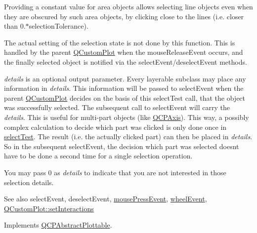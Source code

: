 Providing a constant value for area objects allows selecting line objects even when they are obscured by such area objects, by clicking close to the lines (i.\+e. closer than 0.$\ast$selection\+Tolerance).

The actual setting of the selection state is not done by this function. This is handled by the parent \hyperlink{class_q_custom_plot}{Q\+Custom\+Plot} when the mouse\+Release\+Event occurs, and the finally selected object is notified via the select\+Event/deselect\+Event methods.

{\itshape details} is an optional output parameter. Every layerable subclass may place any information in {\itshape details}. This information will be passed to select\+Event when the parent \hyperlink{class_q_custom_plot}{Q\+Custom\+Plot} decides on the basis of this select\+Test call, that the object was successfully selected. The subsequent call to select\+Event will carry the {\itshape details}. This is useful for multi-\/part objects (like \hyperlink{class_q_c_p_axis}{Q\+C\+P\+Axis}). This way, a possibly complex calculation to decide which part was clicked is only done once in \hyperlink{class_q_c_p_error_bars_ac1b6675ef43e32547a3cbcf7b7ac46ed}{select\+Test}. The result (i.\+e. the actually clicked part) can then be placed in {\itshape details}. So in the subsequent select\+Event, the decision which part was selected doesn\textquotesingle{}t have to be done a second time for a single selection operation.

You may pass 0 as {\itshape details} to indicate that you are not interested in those selection details.

\begin{DoxySeeAlso}{See also}
select\+Event, deselect\+Event, \hyperlink{class_q_c_p_layerable_af6567604818db90f4fd52822f8bc8376}{mouse\+Press\+Event}, \hyperlink{class_q_c_p_layerable_a47dfd7b8fd99c08ca54e09c362b6f022}{wheel\+Event}, \hyperlink{class_q_custom_plot_a5ee1e2f6ae27419deca53e75907c27e5}{Q\+Custom\+Plot\+::set\+Interactions} 
\end{DoxySeeAlso}


Implements \hyperlink{class_q_c_p_abstract_plottable_a38efe9641d972992a3d44204bc80ec1d}{Q\+C\+P\+Abstract\+Plottable}.

